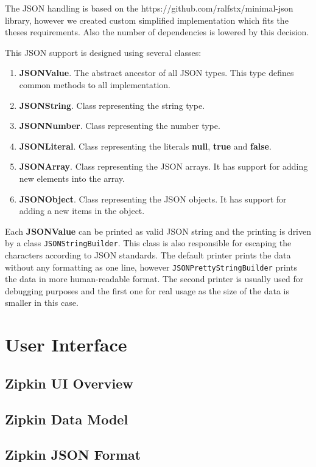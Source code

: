 The JSON handling is based on the https://github.com/ralfstx/minimal-json library, however we created custom simplified implementation which fits the theses requirements. Also the number of dependencies is lowered by this decision. 

This JSON support is designed using several classes:
\begin{enumerate}
	\item \textbf{JSONValue}. The abstract ancestor of all JSON types. This type defines common methods to all implementation.
	\item \textbf{JSONString}. Class representing the string type.
	\item \textbf{JSONNumber}. Class representing the number type.
	\item \textbf{JSONLiteral}. Class representing the literals \textbf{null}, \textbf{true} and \textbf{false}.
	\item \textbf{JSONArray}. Class representing the JSON arrays. It has support for adding new elements into the array.
	\item \textbf{JSONObject}. Class representing the JSON objects. It has support for adding a new items in the object.
\end{enumerate}

Each \textbf{JSONValue} can be printed as valid JSON string and the printing is driven by a class \texttt{JSONStringBuilder}. This class is also responsible for escaping the characters according to JSON standards. The default printer prints the data without any formatting as one line, however \texttt{JSONPrettyStringBuilder} prints the data in more human-readable format. The second printer is usually used for debugging purposes and the first one for real usage as the size of the data is smaller in this case.

\section{User Interface}
\label{sec:zipkin_ui}
\subsection{Zipkin UI Overview}
\subsection{Zipkin Data Model}
\subsection{Zipkin JSON Format}

